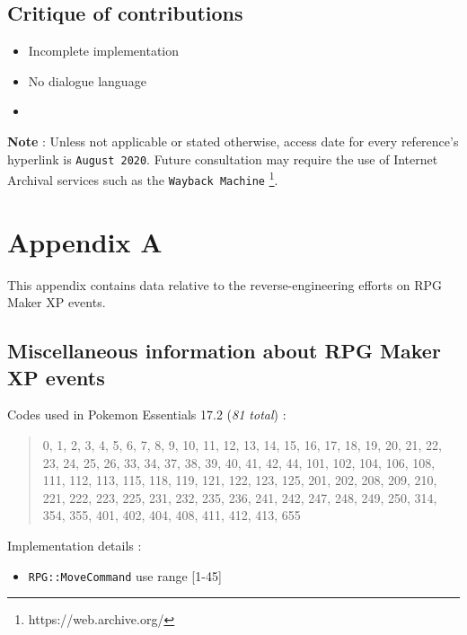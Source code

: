 \documentclass[11pt]{article}
\begin{document}
{\subsection{Critique of contributions}

\begin{itemize}
	\item Incomplete implementation
	\item No dialogue language
	\item 
\end{itemize}





\newpage

\nocite{*} %
\printbibliography[heading=bibintoc,title={Bibliography}]

\vspace{8mm}
\textbf{Note} : Unless not applicable or stated otherwise, access date for every reference's hyperlink is \texttt{August 2020}. Future consultation may require the use of Internet Archival services such as the \texttt{Wayback Machine} \footnote[1]{https://web.archive.org/}.



\newpage
\section*{Appendix A}

This appendix contains data relative to the reverse-engineering efforts on RPG Maker XP events.

\subsection*{Miscellaneous information about RPG Maker XP events}

Codes used in Pokemon Essentials 17.2 (\textit{81 total}) :
\begin{quote}
	0, 1, 2, 3, 4, 5, 6, 7, 8, 9, 10, 11, 12, 13, 14, 15, 16, 17, 18, 19, 20, 21, 22, 23, 24, 25, 26, 33, 34, 37, 38, 39, 40, 41, 42, 44, 101, 102, 104, 106, 108, 111, 112, 113, 115, 118, 119, 121, 122, 123, 125, 201, 202, 208, 209, 210, 221, 222, 223, 225, 231, 232, 235, 236, 241, 242, 247, 248, 249, 250, 314, 354, 355, 401, 402, 404, 408, 411, 412, 413, 655
\end{quote}

Implementation details :
\begin{itemize}
	\item \verb|RPG::MoveCommand| use range [1-45]
	

\end{itemize}}
\end{document}
